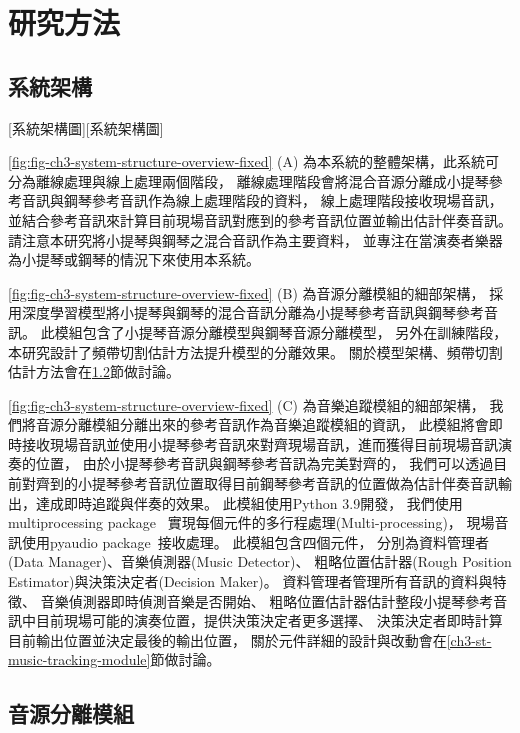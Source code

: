 \documentclass[class=NCU_thesis, crop=false]{standalone}
\begin{document}
\chapter{研究方法}

\section{系統架構} \label{ch3-st-system-structure}
[系統架構圖][系統架構圖]

\cref{fig:fig-ch3-system-structure-overview-fixed} (A)
為本系統的整體架構，此系統可分為離線處理與線上處理兩個階段，
離線處理階段會將混合音源分離成小提琴參考音訊與鋼琴參考音訊作為線上處理階段的資料，
線上處理階段接收現場音訊，並結合參考音訊來計算目前現場音訊對應到的參考音訊位置並輸出估計伴奏音訊。
請注意本研究將小提琴與鋼琴之混合音訊作為主要資料，
並專注在當演奏者樂器為小提琴或鋼琴的情況下來使用本系統。

\cref{fig:fig-ch3-system-structure-overview-fixed} (B)
為音源分離模組的細部架構，
採用深度學習模型將小提琴與鋼琴的混合音訊分離為小提琴參考音訊與鋼琴參考音訊。
此模組包含了小提琴音源分離模型與鋼琴音源分離模型，
另外在訓練階段，本研究設計了頻帶切割估計方法提升模型的分離效果。
關於模型架構、頻帶切割估計方法會在\ref{ch3-st-mss-module}節做討論。

\cref{fig:fig-ch3-system-structure-overview-fixed} (C)
為音樂追蹤模組的細部架構，
我們將音源分離模組分離出來的參考音訊作為音樂追蹤模組的資訊，
此模組將會即時接收現場音訊並使用小提琴參考音訊來對齊現場音訊，進而獲得目前現場音訊演奏的位置，
由於小提琴參考音訊與鋼琴參考音訊為完美對齊的，
我們可以透過目前對齊到的小提琴參考音訊位置取得目前鋼琴參考音訊的位置做為估計伴奏音訊輸出，達成即時追蹤與伴奏的效果。
此模組使用Python 3.9開發，
我們使用multiprocessing package~\cite{python2024multiprocessing}
實現每個元件的多行程處理(Multi-processing)，
現場音訊使用pyaudio package~\cite{python2024pyaudio}接收處理。
此模組包含四個元件，
分別為資料管理者(Data Manager)、音樂偵測器(Music Detector)、
粗略位置估計器(Rough Position Estimator)與決策決定者(Decision Maker)。
資料管理者管理所有音訊的資料與特徵、
音樂偵測器即時偵測音樂是否開始、
粗略位置估計器估計整段小提琴參考音訊中目前現場可能的演奏位置，提供決策決定者更多選擇、
決策決定者即時計算目前輸出位置並決定最後的輸出位置，
關於元件詳細的設計與改動會在\ref{ch3-st-music-tracking-module}節做討論。

\pagebreak

\section{音源分離模組} \label{ch3-st-mss-module}
\end{document}
